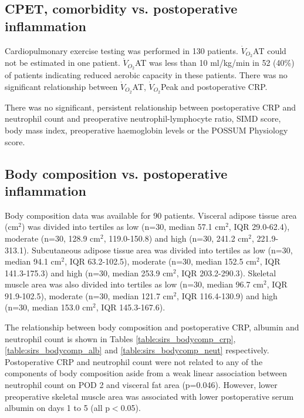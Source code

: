 \subsection{CPET, comorbidity vs. postoperative inflammation}
Cardiopulmonary exercise testing was performed in 130 patients. 
$\dot{V}_{O_2}$AT could not be estimated in one patient.
$\dot{V}_{O_2}$AT was less than 10 ml/kg/min in 52 (40\%) of patients indicating reduced aerobic capacity in these patients.
There was no significant relationship between $\dot{V}_{O_2}$AT, $\dot{V}_{O_2}$Peak and postoperative CRP.%

There was no significant, persistent relationship between postoperative CRP and neutrophil count and preoperative neutrophil-lymphocyte ratio, SIMD score, body mass index, preoperative haemoglobin levels or the POSSUM Physiology score. 

\subsection{Body composition vs. postoperative inflammation}
Body composition data was available for 90 patients.
Visceral adipose tissue area (cm$^2$) was divided into tertiles as low (n=30, median 57.1 cm$^2$, IQR 29.0-62.4), moderate (n=30, 128.9 cm$^2$, 119.0-150.8) and high (n=30, 241.2 cm$^2$, 221.9-313.1). 
Subcutaneous adipose tissue area was divided into tertiles as low (n=30, median 94.1 cm$^2$, IQR 63.2-102.5), moderate (n=30, median 152.5 cm$^2$, IQR 141.3-175.3) and high (n=30, median 253.9 cm$^2$, IQR 203.2-290.3).
Skeletal muscle area was also divided into tertiles as low (n=30, median 96.7 cm$^2$, IQR 91.9-102.5), moderate (n=30, median 121.7 cm$^2$, IQR 116.4-130.9) and high (n=30, median 153.0 cm$^2$, IQR 145.3-167.6).

The relationship between body composition and postoperative CRP, albumin and neutrophil count is shown in Tables \ref{table:sirs_bodycomp_crp}, \ref{table:sirs_bodycomp_alb} and \ref{table:sirs_bodycomp_neut} respectively.
Postoperative CRP and neutrophil count were not related to any of the components of body composition aside from a weak linear association between neutrophil count on POD 2 and visceral fat area (p=0.046).
However, lower preoperative skeletal muscle area was associated with lower postoperative serum albumin on days 1 to 5 (all p$<$0.05).








